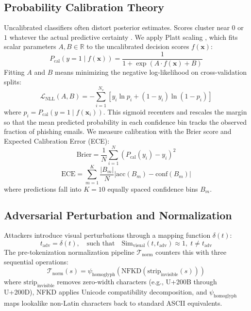 \documentclass[conference]{IEEEtran}
\begin{document}
\subsection{Probability Calibration Theory}
Uncalibrated classifiers often distort posterior estimates. Scores cluster near $0$ or $1$ whatever the actual predictive certainty \cite{guo2017}. We apply Platt scaling \cite{platt1999}, which fits scalar parameters $A, B \in \mathbb{R}$ to the uncalibrated decision scores $f(\mathbf{x})$:
\begin{equation}
\label{eq:platt}
P_{\text{cal}}(y=1 \mid f(\mathbf{x})) = \frac{1}{1 + \exp(A \cdot f(\mathbf{x}) + B)}
\end{equation}
Fitting $A$ and $B$ means minimizing the negative log-likelihood on cross-validation splits:
\begin{equation}
\mathcal{L}_{\text{NLL}}(A, B) = -\sum_{i=1}^{N_v} \left[ y_i \ln p_i + (1 - y_i) \ln(1 - p_i) \right]
\end{equation}
where $p_i = P_{\text{cal}}(y=1 \mid f(\mathbf{x}_i))$. This sigmoid recenters and rescales the margin so that the mean predicted probability in each confidence bin tracks the observed fraction of phishing emails. We measure calibration with the Brier score and Expected Calibration Error (ECE):
\begin{equation}
\text{Brier} = \frac{1}{N} \sum_{i=1}^N \left(P_{\text{cal}}(y_i) - y_i\right)^2
\end{equation}
\begin{equation}
\text{ECE} = \sum_{m=1}^{K} \frac{|B_m|}{N} \left| \text{acc}(B_m) - \text{conf}(B_m) \right|
\end{equation}
where predictions fall into $K=10$ equally spaced confidence bins $B_m$.

\subsection{Adversarial Perturbation and Normalization}
Attackers introduce visual perturbations through a mapping function $\delta(t)$:
\begin{equation}
t_{\text{adv}} = \delta(t), \quad \text{such that} \quad \text{Sim}_{\text{visual}}(t, t_{\text{adv}}) \approx 1, \; t \neq t_{\text{adv}}
\end{equation}
The pre-tokenization normalization pipeline $\mathcal{T}_{\text{norm}}$ counters this with three sequential operations:
\begin{equation}
\mathcal{T}_{\text{norm}}(s) = \psi_{\text{homoglyph}}\left( \text{NFKD}\left( \text{strip}_{\text{invisible}}(s) \right) \right)
\end{equation}
where $\text{strip}_{\text{invisible}}$ removes zero-width characters (e.g., U+200B through U+200D), NFKD applies Unicode compatibility decomposition, and $\psi_{\text{homoglyph}}$ maps lookalike non-Latin characters back to standard ASCII equivalents.
\end{document}
